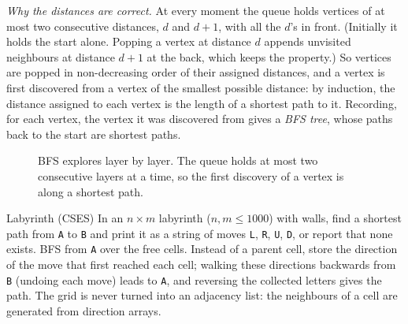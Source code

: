 \emph{Why the distances are correct.} At every moment the queue holds vertices of at most two consecutive distances, $d$ and
$d + 1$, with all the $d$'s in front. (Initially it holds the start alone. Popping a vertex at distance $d$ appends
unvisited neighbours at distance $d + 1$ at the back, which keeps the property.) So vertices are popped in non-decreasing order
of their assigned distances, and a vertex is first discovered from a vertex of the smallest possible distance: by induction,
the distance assigned to each vertex is the length of a shortest path to it. Recording, for each vertex, the vertex it was
discovered from gives a \emph{BFS tree}, whose paths back to the start are shortest paths.

\begin{figure}[htbp]
\centering
{}
\caption{BFS explores layer by layer. The queue holds at most two consecutive layers at a time, so the first discovery of a
vertex is along a shortest path.}
\label{fig:bfslayers}
\end{figure}


\begin{problem}{Labyrinth (CSES)}
In an $n \times m$ labyrinth ($n, m \le 1000$) with walls, find a shortest path from \texttt{A} to \texttt{B} and print it as
a string of moves \texttt{L}, \texttt{R}, \texttt{U}, \texttt{D}, or report that none exists.
\solution BFS from \texttt{A} over the free cells. Instead of a parent cell, store the direction of the move that first
reached each cell; walking these directions backwards from \texttt{B} (undoing each move) leads to \texttt{A}, and reversing
the collected letters gives the path. The grid is never turned into an adjacency list: the neighbours of a cell are generated
from direction arrays.
\end{problem}

